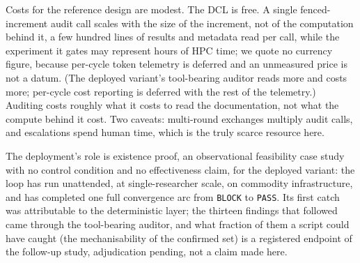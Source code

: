 \documentclass[11pt]{article}
\begin{document}
Costs for the reference design are modest. The DCL is free. A single fenced-increment audit call scales with the size of the increment, not of the computation behind it, a few hundred lines of results and metadata read per call, while the experiment it gates may represent hours of HPC time; we quote no currency figure, because per-cycle token telemetry is deferred and an unmeasured price is not a datum. (The deployed variant's tool-bearing auditor reads more and costs more; per-cycle cost reporting is deferred with the rest of the telemetry.) Auditing costs roughly what it costs to read the documentation, not what the compute behind it cost. Two caveats: multi-round exchanges multiply audit calls, and escalations spend human time, which is the truly scarce resource here.

The deployment's role is existence proof, an observational feasibility case study with no control condition and no effectiveness claim, for the deployed variant: the loop has run unattended, at single-researcher scale, on commodity infrastructure, and has completed one full convergence arc from \texttt{BLOCK} to \texttt{PASS}. Its first catch was attributable to the deterministic layer; the thirteen findings that followed came through the tool-bearing auditor, and what fraction of them a script could have caught (the mechanisability of the confirmed set) is a registered endpoint of the follow-up study, adjudication pending, not a claim made here.
\end{document}

